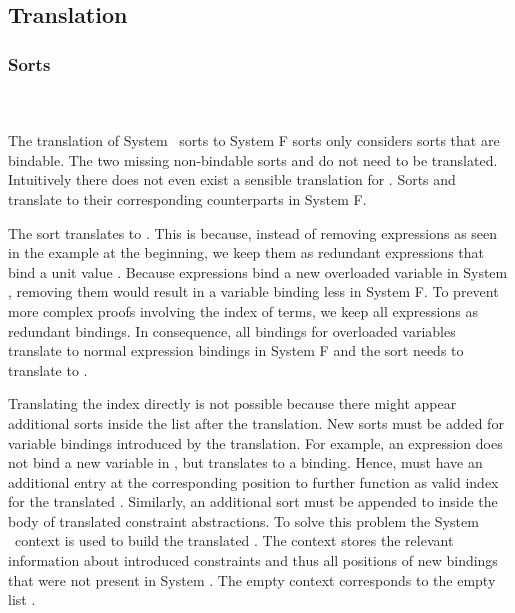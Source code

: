 \subsection{Translation}
\subsubsection{Sorts}\hfill\\\\
The translation of System \Fo\ sorts to System F sorts only considers sorts that are bindable. 
The two missing non-bindable sorts  and  do not need to be translated. 
Intuitively there does not even exist a sensible translation for .
\DPTSort
Sorts  and  translate to their corresponding counterparts in System F. 

\noindent The sort  translates to .
This is because, instead of removing  expressions as seen in the example at the beginning, we keep them as redundant  expressions that bind a unit value . 
Because  expressions bind a new overloaded variable in System \Fo, removing them would result in a variable binding less in System F. To prevent more complex proofs involving the index  of terms, we keep all  expressions as redundant  bindings.
In consequence, all bindings for overloaded variables translate to normal expression bindings in System F and the sort  needs to translate to .

\noindent Translating the index  directly is not possible because there might appear additional sorts inside the list after the translation. 
New sorts must be added for variable bindings introduced by the translation. 
For example, an    \Constr{=}    expression does not bind a new variable in , but translates to a     binding. 
Hence,  must have an additional entry  at the corresponding position to further function as valid index for the translated . 
Similarly, an additional sort  must be appended to  inside the body of translated constraint abstractions.
To solve this problem the System \Fo\ context  is used to build the translated . 
The context stores the relevant information about introduced constraints and thus all positions of new bindings that were not present in System \Fo. 
\DPTSorts
The empty context  corresponds to the empty list \Constr{[]}.

